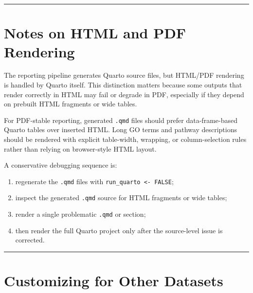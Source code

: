 \documentclass[
  letterpaper,
  DIV=11,
  numbers=noendperiod,
  openany,
  oneside]{scrreprt}
\providecommand{\tightlist}{%
  \setlength{\itemsep}{0pt}\setlength{\parskip}{0pt}}
\begin{document}
\begin{center}\rule{0.5\linewidth}{0.5pt}\end{center}

\section*{Notes on HTML and PDF
Rendering}\label{notes-on-html-and-pdf-rendering}


The reporting pipeline generates Quarto source files, but HTML/PDF
rendering is handled by Quarto itself. This distinction matters because
some outputs that render correctly in HTML may fail or degrade in PDF,
especially if they depend on prebuilt HTML fragments or wide tables.

For PDF-stable reporting, generated \texttt{.qmd} files should prefer
data-frame-based Quarto tables over inserted HTML. Long GO terms and
pathway descriptions should be rendered with explicit table-width,
wrapping, or column-selection rules rather than relying on browser-style
HTML layout.

A conservative debugging sequence is:

\begin{enumerate}
\def\labelenumi{\arabic{enumi}.}
\tightlist
\item
  regenerate the \texttt{.qmd} files with
  \texttt{run\_quarto\ \textless{}-\ FALSE};
\item
  inspect the generated \texttt{.qmd} source for HTML fragments or wide
  tables;
\item
  render a single problematic \texttt{.qmd} or section;
\item
  then render the full Quarto project only after the source-level issue
  is corrected.
\end{enumerate}

\begin{center}\rule{0.5\linewidth}{0.5pt}\end{center}

\section*{Customizing for Other
Datasets}\label{customizing-for-other-datasets-1}

\end{document}
